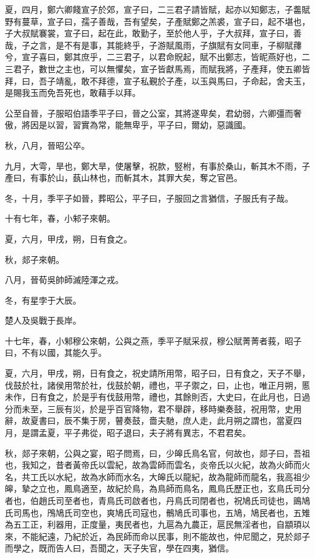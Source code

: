 \begin{pinyinscope}
夏，四月，鄭六卿餞宣子於郊，宣子曰，二三君子請皆賦，起亦以知鄭志，子齹賦野有蔓草，宣子曰，孺子善哉，吾有望矣，子產賦鄭之羔裘，宣子曰，起不堪也，子大叔賦褰裳，宣子曰，起在此，敢勤子，至於他人乎，子大叔拜，宣子曰，善哉，子之言，是不有是事，其能終乎，子游賦風雨，子旗賦有女同車，子柳賦蘀兮，宣子喜曰，鄭其庶乎，二三君子，以君命貺起，賦不出鄭志，皆昵燕好也，二三君子，數世之主也，可以無懼矣，宣子皆獻馬焉，而賦我將，子產拜，使五卿皆拜，曰，吾子靖亂，敢不拜德，宣子私覲於子產，以玉與馬曰，子命起，舍夫玉，是賜我玉而免吾死也，敢藉手以拜。

公至自晉，子服昭伯語季平子曰，晉之公室，其將遂卑矣，君幼弱，六卿彊而奢傲，將因是以習，習實為常，能無卑乎，平子曰，爾幼，惡識國。

秋，八月，晉昭公卒。

九月，大雩，旱也，鄭大旱，使屠擊，祝款，竪柎，有事於桑山，斬其木不雨，子產曰，有事於山，蓺山林也，而斬其木，其罪大矣，奪之官邑。

冬，十月，季平子如晉，葬昭公，平子曰，子服回之言猶信，子服氏有子哉。

十有七年，春，小邾子來朝。

夏，六月，甲戌，朔，日有食之。

秋，郯子來朝。

八月，晉荀吳帥師滅陸渾之戎。

冬，有星孛于大辰。

楚人及吳戰于長岸。

十七年，春，小邾穆公來朝，公與之燕，季平子賦采叔，穆公賦菁菁者莪，昭子曰，不有以國，其能久乎。

夏，六月，甲戌，朔，日有食之，祝史請所用幣，昭子曰，日有食之，天子不舉，伐鼓於社，諸侯用幣於社，伐鼓於朝，禮也，平子禦之，曰，止也，唯正月朔，慝未作，日有食之，於是乎有伐鼓用幣，禮也，其餘則否，大史曰，在此月也，日過分而未至，三辰有災，於是乎百官降物，君不舉辟，移時樂奏鼓，祝用幣，史用辭，故夏書曰，辰不集于房，瞽奏鼓，嗇夫馳，庶人走，此月朔之謂也，當夏四月，是謂孟夏，平子弗從，昭子退曰，夫子將有異志，不君君矣。

秋，郯子來朝，公與之宴，昭子問焉，曰，少皞氏鳥名官，何故也，郯子曰，吾祖也，我知之，昔者黃帝氏以雲紀，故為雲師而雲名，炎帝氏以火紀，故為火師而火名，共工氏以水紀，故為水師而水名，大皞氏以龍紀，故為龍師而龍名，我高祖少皞，摯之立也，鳳鳥適至，故紀於鳥，為鳥師而鳥名，鳳鳥氏歷正也，玄鳥氏司分者也，伯趙氏司至者也，青鳥氏司啟者也，丹鳥氏司閉者也，祝鳩氏司徒也，鴡鳩氏司馬也，鳲鳩氏司空也，爽鳩氏司寇也，鶻鳩氏司事也，五鳩，鳩民者也，五雉為五工正，利器用，正度量，夷民者也，九扈為九農正，扈民無淫者也，自顓頊以來，不能紀遠，乃紀於近，為民師而命以民事，則不能故也，仲尼聞之，見於郯子而學之，既而告人曰，吾聞之，天子失官，學在四夷，猶信。


\end{pinyinscope}
